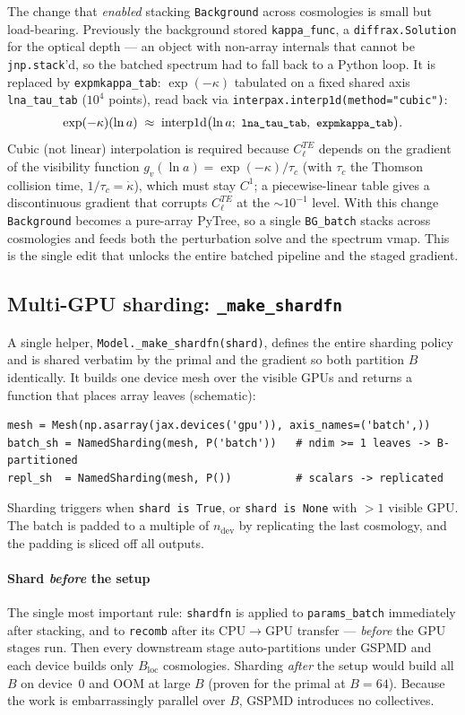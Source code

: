 \documentclass[11pt]{article}
\newcommand{\code}[1]{\texttt{\small #1}}
\newcommand{\Cl}{C_\ell}
\newcommand{\Bloc}{B_{\mathrm{loc}}}
\begin{document}
The change that \emph{enabled} stacking \code{Background} across
cosmologies is small but load-bearing. Previously the background stored
\code{kappa\_func}, a \code{diffrax.Solution} for the optical depth ---
an object with non-array internals that cannot be \code{jnp.stack}'d, so
the batched spectrum had to fall back to a Python loop. It is replaced by
\code{expmkappa\_tab}: $\exp(-\kappa)$ tabulated on a fixed shared axis
\code{lna\_tau\_tab} ($10^4$ points), read back via
\code{interpax.interp1d(method="cubic")}:
\begin{equation}
\exp(-\kappa)(\ln a)\;\approx\;
\mathrm{interp1d}\bigl(\ln a;\ \text{\code{lna\_tau\_tab}},\ \text{\code{expmkappa\_tab}}\bigr).
\end{equation}
Cubic (not linear) interpolation is required because $\Cl^{TE}$ depends on
the gradient of the visibility function $g_v(\ln a)=\exp(-\kappa)/\tau_c$
(with $\tau_c$ the Thomson collision time, $1/\tau_c=\dot\kappa$), which
must stay $C^1$; a piecewise-linear table gives a discontinuous gradient
that corrupts $\Cl^{TE}$ at the $\sim10^{-1}$ level. With this change
\code{Background} becomes a pure-array PyTree, so a single \code{BG\_batch}
stacks across cosmologies and feeds both the perturbation solve and the
spectrum vmap. This is the single edit that unlocks the entire batched
pipeline and the staged gradient.

\subsection{Multi-GPU sharding: \texttt{\_make\_shardfn}}
\label{sec:sharding}

A single helper, \code{Model.\_make\_shardfn(shard)}, defines the entire
sharding policy and is shared verbatim by the primal and the gradient so
both partition $B$ identically. It builds one device mesh over the
visible GPUs and returns a function that places array leaves (schematic):
\begin{lstlisting}
mesh = Mesh(np.asarray(jax.devices('gpu')), axis_names=('batch',))
batch_sh = NamedSharding(mesh, P('batch'))   # ndim >= 1 leaves -> B-partitioned
repl_sh  = NamedSharding(mesh, P())          # scalars -> replicated
\end{lstlisting}
Sharding triggers when \code{shard is True}, or \code{shard is None} with
$>1$ visible GPU. The batch is padded to a multiple of $n_{\mathrm{dev}}$
by replicating the last cosmology, and the padding is sliced off all
outputs.

\paragraph{Shard \emph{before} the setup}
The single most important rule: \code{shardfn} is applied to
\code{params\_batch} immediately after stacking, and to \code{recomb}
after its CPU$\to$GPU transfer --- \emph{before} the GPU stages run.
Then every downstream stage auto-partitions under GSPMD and each device
builds only $\Bloc$ cosmologies. Sharding \emph{after} the setup would
build all $B$ on device~0 and OOM at large $B$ (proven for the primal at
$B=64$). Because the work is embarrassingly parallel over $B$, GSPMD
introduces no collectives.
\end{document}
